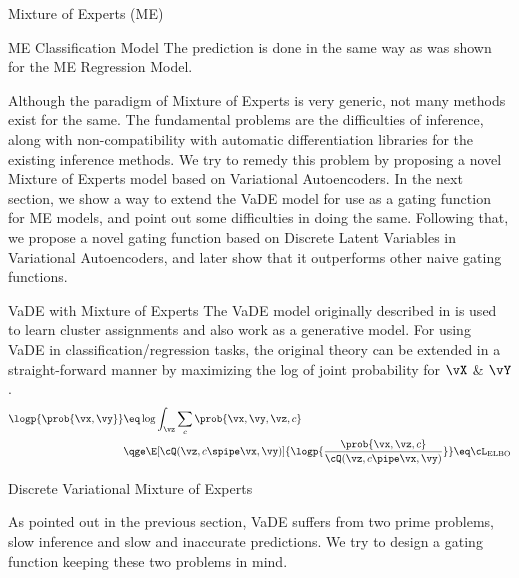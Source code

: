 \documentclass{article}
\begin{document}
\begin{psection}{Mixture of Experts (ME)}
\begin{psubsection}{ME Classification Model}
		The prediction is done in the same way as was shown for the ME Regression Model.

	\end{psubsection}

	Although the paradigm of Mixture of Experts is very generic, not many methods exist for the same. The fundamental problems are the difficulties of inference, along with non-compatibility with automatic differentiation libraries for the existing inference methods. We try to remedy this problem by proposing a novel Mixture of Experts model based on Variational Autoencoders. In the next section, we show a way to extend the VaDE model for use as a gating function for ME models, and point out some difficulties in doing the same. Following that, we propose a novel gating function based on Discrete Latent Variables in Variational Autoencoders, and later show that it outperforms other naive gating functions.
\end{psection}

\begin{psection}{VaDE with Mixture of Experts}
	The VaDE model originally described in \cite{vade} is used to learn cluster assignments and also work as a generative model. For using VaDE in classification/regression tasks, the original theory can be extended in a straight-forward manner by maximizing the log of joint probability for $\vX$ \& $\vY$.
	\begin{align*}
		\logp{\prob{\vx, \vy}} &\eq \log{\int_\vz \sum_c\prob{\vx, \vy, \vz, c}} \\
		&\qge \E[\cQ(\vz, c \spipe \vx, \vy)]{\logp{\frac{\prob{\vx, \vz, c}}{\cQ(\vz, c \pipe \vx, \vy)}}} \eq \cL_{\text{ELBO}}
	\end{align*}
\end{psection}

\begin{psection}{Discrete Variational Mixture of Experts}

	As pointed out in the previous section, VaDE suffers from two prime problems, slow inference and slow and inaccurate predictions. We try to design a gating function keeping these two problems in mind.

\end{psection}
\end{document}
